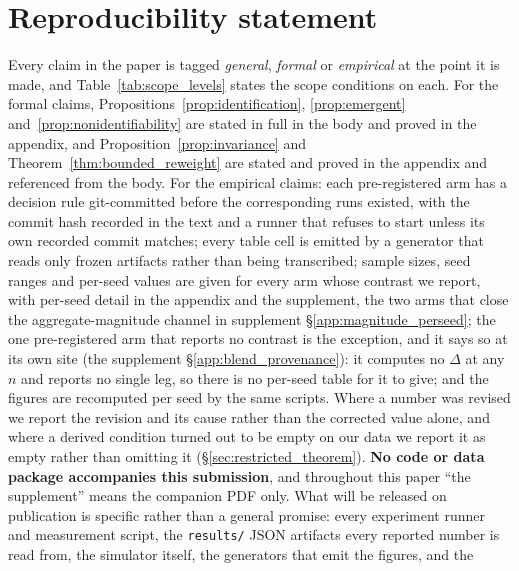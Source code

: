 \documentclass{article}
\begin{document}
\section*{Reproducibility statement}

Every claim in the paper is tagged \emph{general}, \emph{formal} or \emph{empirical} at the
point it is made, and Table~\ref{tab:scope_levels} states the scope conditions on each.
For the formal claims, Propositions~\ref{prop:identification}, \ref{prop:emergent}
and~\ref{prop:nonidentifiability} are stated in full in the body and proved in the appendix, and
Proposition~\ref{prop:invariance} and Theorem~\ref{thm:bounded_reweight} are stated and
proved in the appendix and referenced from the body. For the empirical
claims: each pre-registered arm has a decision rule git-committed before the corresponding
runs existed, with the commit hash recorded in the text and a runner that refuses to start
unless its own recorded commit matches; every table cell is emitted by a generator that
reads only frozen artifacts rather than being transcribed; sample sizes, seed ranges and
per-seed values are given for every arm whose contrast we report, with per-seed detail in the appendix
and the supplement, the two arms that close the aggregate-magnitude channel in supplement
§\ref{app:magnitude_perseed}; the one pre-registered arm that reports no contrast is the exception, and
it says so at its own site (the supplement §\ref{app:blend_provenance}): it computes no $\Delta$ at any
$n$ and reports no single leg, so there is no per-seed table for it to give; and the
figures are recomputed per seed by the same scripts. Where a number was revised we report
the revision and its cause rather than the corrected value alone, and where a derived
condition turned out to be empty on our data we report it as empty rather than omitting it
(§\ref{sec:restricted_theorem}). \textbf{No code or data package accompanies this
submission}, and throughout this paper ``the supplement'' means the companion PDF only. What
will be released on publication is specific rather than a general promise: every experiment
runner and measurement script, the \texttt{results/} JSON artifacts every reported number is
read from, the simulator itself, the generators that emit the figures, and the
\end{document}
